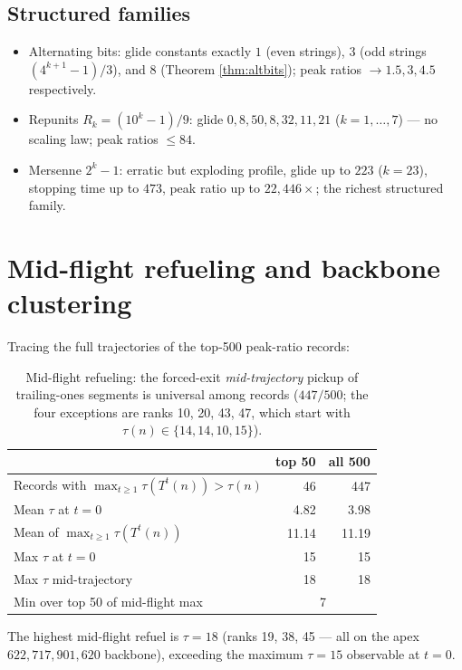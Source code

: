 \documentclass[11pt]{article}
\theoremstyle{remark}
\newcommand{\T}{T}
\begin{document}
\subsection{Structured families}
\begin{itemize}
  \item Alternating bits: glide constants exactly $1$ (even strings), $3$
        (odd strings $(4^{k+1}-1)/3$), and $8$ (Theorem
        \ref{thm:altbits}); peak ratios $\to 1.5, 3, 4.5$ respectively.
  \item Repunits $R_k = (10^k - 1)/9$: glide $0, 8, 50, 8, 32, 11, 21$
        ($k = 1, \dots, 7$) --- no scaling law; peak ratios $\le 84$.
  \item Mersenne $2^k - 1$: erratic but exploding profile, glide up to
        $223$ ($k = 23$), stopping time up to $473$, peak ratio up to
        $22{,}446\times$; the richest structured family.
\end{itemize}

\section{Mid-flight refueling and backbone clustering}
\label{sec:refuel}
Tracing the full trajectories of the top-500 peak-ratio records:

\begin{table}[t]
\centering
\begin{tabular}{@{}lrr@{}}
\toprule
 & top 50 & all 500 \\
\midrule
Records with $\max_{t \ge 1}\tau(\T^t(n)) > \tau(n)$ & 46 & 447 \\
Mean $\tau$ at $t = 0$ & 4.82 & 3.98 \\
Mean of $\max_{t \ge 1} \tau(\T^t(n))$ & 11.14 & 11.19 \\
Max $\tau$ at $t = 0$ & 15 & 15 \\
Max $\tau$ mid-trajectory & 18 & 18 \\
Min over top 50 of mid-flight max & \multicolumn{2}{c}{7} \\
\bottomrule
\end{tabular}
\caption{Mid-flight refueling: the forced-exit \emph{mid-trajectory}
pickup of trailing-ones segments is universal among records ($447/500$;
the four exceptions are ranks 10, 20, 43, 47, which start with
$\tau(n) \in \{14, 14, 10, 15\}$).}
\label{tab:refuel}
\end{table}

The highest mid-flight refuel is $\tau = 18$ (ranks 19, 38, 45 --- all on
the apex $622{,}717{,}901{,}620$ backbone), exceeding the maximum $\tau =
15$ observable at $t = 0$.
\end{document}
